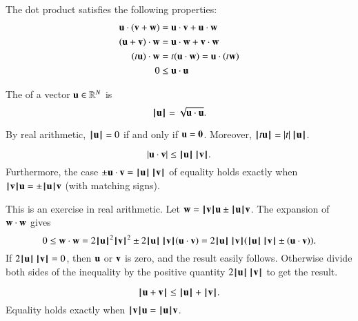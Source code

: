 The dot product satisfies the following
properties:
\begin{align}\label{eqn:dot}
\u \cdot (\v + \w) &= \u \cdot \v + \u \cdot \w\nonumber\\
(\u + \v)\cdot \w &= \u \cdot \w + \v \cdot \w\nonumber\\
(t \u)\cdot \w &= t(\u \cdot \w) = \u \cdot (t \w)\\
0 &\le \u\cdot \u\nonumber
\end{align}


\begin{definition}[norm]
\label{def:norm}
The  of a vector $\u\in\ring{R}^N$ is
\[ \normo{\u} = \sqrt{\u\cdot \u}.\] 
%
\end{definition}

By  real arithmetic,
$\normo{\u}=0$  if and only if $\u=\orz$.  Moreover,
$\normo{ t \u } = |t| \, \normo{\u}$.   



\begin{lemma}
  \[ |\u \cdot \v| \le
    \normo{\u}\,\normo{\v}.\]  Furthermore, the case
  $\pm \u\cdot \v = \normo{\u}\,\normo{\v}$ of equality holds exactly
  when $\normo{\v} \u = \pm\normo{\u} \v$ (with matching signs).
\end{lemma}
%

\begin{proved}
  This is an exercise in real arithmetic.  Let $\w = \normo{\v} \u \pm
  \normo{\u} \v$.  The expansion of $\w\cdot \w$ gives
  \[ 0\le \w\cdot \w = 2\normo{\u}^2\normo{\v}^2 \pm
    2\normo{\u}\, \normo{\v} (\u\cdot \v) = 2\normo{\u}\, \normo{\v}
    (\normo{\u}\, \normo{\v} \pm (\u \cdot \v)).\]  If
  $2\normo{\u} \,\normo{\v} = 0$, then $\u$ or $\v$ is zero, and the
  result easily follows.  Otherwise divide both sides of the
  inequality by the positive quantity $2 \normo{\u} \,\normo{\v}$ to
  get the result.  \swallowed\end{proved}

\begin{lemma}
\label{lemma:triangle-ineq}
\[ 
\normo{\u + \v} \le \normo{\u} + \normo{\v }.
\] 
Equality holds exactly when $\normo{\v}\u = \normo{\u}\v$.
\end{lemma}
%

